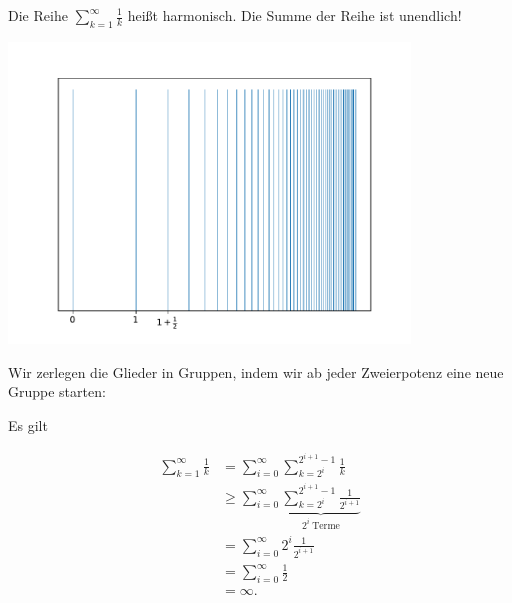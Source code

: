 \begin{bsp} 
	Die Reihe $\sum_{k=1}^\infty \frac{1}{k}$ heißt harmonisch. Die Summe der Reihe ist unendlich! 
	
	\begin{center}
		\includegraphics[width=0.8\textwidth]{pics/harmonic.pdf}
	\end{center}
	
	Wir zerlegen die Glieder in Gruppen, indem wir ab jeder Zweierpotenz eine neue Gruppe starten: 
 
	 Es gilt 
	
	\begin{align*}
		\sum_{k=1}^\infty \frac{1}{k} & = \sum_{i=0}^\infty \sum_{k=2^i}^{2^{i+1}-1} \frac{1}{k}
		\\ & \ge \sum_{i=0}^\infty \underbrace{\sum_{k=2^i}^{2^{i+1}-1} \frac{1}{2^{i+1}}}_{2^i \ \text{Terme}}
		\\ & = \sum_{i=0}^\infty 2^i \frac{1}{2^{i+1}}
		\\ & = \sum_{i=0}^\infty \frac{1}{2} 
		\\ & = \infty.  
	\end{align*}
\end{bsp} 

